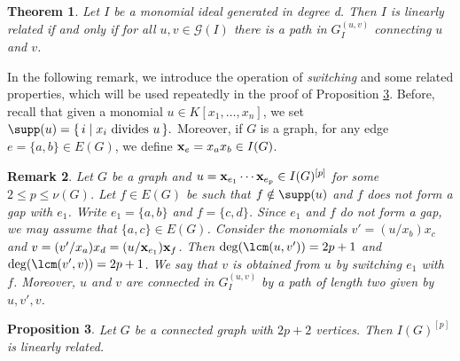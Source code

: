 \documentclass[12pt]{amsart}
\newcommand{\cG}{\mathcal{G}}
\newtheorem{Theorem}{Theorem}[section]
\newtheorem{Proposition}[Theorem]{Proposition}
\newtheorem{Remark}[Theorem]{Remark}
\begin{document}
		\begin{Theorem}\cite[Corollary 2.2]{BHZ}\label{ref:BHN}
		   Let $I$ be a monomial ideal generated in degree d. Then $I$ is linearly related if and only if for all $u,v\in \cG(I)$ there is a path in $G^{(u,v)}_{I}$ connecting $u$ and $v$. 
		\end{Theorem}
        
 In the following remark, we introduce the operation of \textit{switching} and some related properties, which will be used repeatedly in the proof of Proposition \ref{prop:connected}. Before, recall that given a monomial $u \in K[x_1, \ldots, x_n]$, we set $\supp(u) = \{\, i \mid x_i \text{ divides } u \,\}.$ Moreover, if $G$ is a graph, for any edge $e = \{a,b\} \in E(G)$, we define ${\bf x}_e = x_a x_b \in I(G)$. 
    
\begin{Remark}\label{rem:switch}
 {\em  
 Let $G$ be a graph and $u = {\bf x}_{e_1} \cdots {\bf x}_{e_p} \in I(G)^{[p]}$ for some $2 \leq p \leq \nu(G)$. 
Let $f \in E(G)$ be such that $f \notin \supp(u)$ and $f$ does not form a gap with $e_1$. 
Write $e_1 = \{a,b\}$ and $f = \{c,d\}$. 
Since $e_1$ and $f$ do not form a gap, we may assume that $\{a,c\} \in E(G)$. 
Consider the monomials $v' = (u/x_b)x_c$ and $v = (v'/x_a)x_d = (u/{\bf x}_{e_1}){\bf x}_{f}$. 
Then $\deg(\lcm(u,v')) = 2p + 1$ and $\deg(\lcm(v',v)) = 2p + 1$. 
We say that $v$ is obtained from $u$ by {\em switching $e_1$ with $f$}. 
Moreover, $u$ and $v$ are connected in $G_I^{(u,v)}$ by a path of length two given by $u, v', v$.
 }
\end{Remark}



\begin{Proposition}\label{prop:connected}
    Let $G$ be a connected graph with $2p+2$ vertices. Then $I(G)^{[p]}$ is linearly related. 
\end{Proposition}
\end{document}
